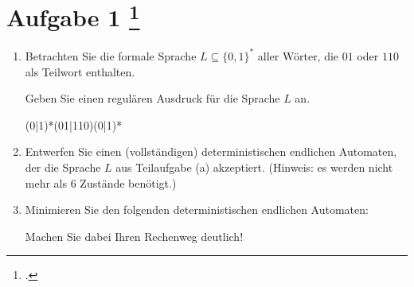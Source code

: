 \documentclass{lehramt-informatik-aufgabe}
\begin{document}
\section{Aufgabe 1
\footcite{46115:2020:03}}

\begin{enumerate}


\item Betrachten Sie die formale Sprache $L \subseteq \{ 0, 1 \}^*$
aller Wörter, die $01$ oder $110$ als Teilwort enthalten.

Geben Sie einen regulären Ausdruck für die Sprache $L$ an.

\begin{liAntwort}
(0|1)*(01|110)(0|1)*
\end{liAntwort}


\item Entwerfen Sie einen (vollständigen) deterministischen endlichen
Automaten, der die Sprache $L$ aus Teilaufgabe (a) akzeptiert. (Hinweis:
es werden nicht mehr als 6 Zustände benötigt.)

\begin{liAntwort}
\begin{center}
\end{center}

\end{liAntwort}


\item Minimieren Sie den folgenden deterministischen endlichen Automaten:

Machen Sie dabei Ihren Rechenweg deutlich!


\end{enumerate}
\end{document}
